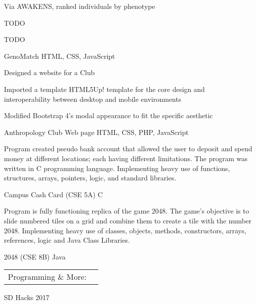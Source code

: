\documentclass[]{awesome-cv}
\begin{document}
\begin{cventries}
	\cventry
	{\begin{cvitems}
	    \item Via AWAKENS, ranked individuals by phenotype
        \item TODO
        \item TODO
    \end{cvitems}}
	{GenoMatch}
	{HTML, CSS, JavaScript}
	{}
	{}
	
	\vspace{-5mm}
	\cventry
	{\begin{cvitems}
        \item Designed a website for a Club
        \item Imported a template HTML5Up! template for the core design and interoperability between desktop and mobile environments
        \item Modified Bootstrap 4’s modal appearance to fit the specific aesthetic
    \end{cvitems}}
	{Anthropology Club Web page}
	{HTML, CSS, PHP, JavaScript}
	{}
	{}

	\vspace{-5mm}
	\cventry
	{\begin{cvitems}
        \item Program created pseudo bank account that allowed the user to deposit and spend money at different locations; each having different limitations. The program was written in C programming language. Implementing heavy use of functions, structures, arrays, pointers, logic, and standard libraries.
    \end{cvitems}}
	{Campus Cash Card (CSE 5A)}
	{C}
	{}
	{}

	\vspace{-5mm}
	\cventry
	{\begin{cvitems}
        \item Program is fully functioning replica of the game 2048. The game's objective is to slide numbered tiles on a grid and combine them to create a tile with the number 2048. Implementing heavy use of classes, objects, methods, constructors, arrays, references, logic and Java Class Libraries.
    \end{cvitems}}
	{2048 (CSE 8B)}
	{Java}
	{}
	{}

	\vspace{-5mm}
\end{cventries}
\begin{cventries}
	\cventry
	{}
	{\def\arraystretch{1.15}{\begin{tabular}{ l l }
		Programming \& More:  & {\skill{ Java, C, HTML, CSS, JavaScript, \LaTeX, MySQL, Git, Unix Shell, Ubuntu}} \\
		\end{tabular}}}
	{}
	{}
	{}
\end{cventries}

\vspace{-7mm}
\begin{cvhonors}
	\cvhonor
	{\begin{cvitems}
	    \item SD Hacks 2017
	\end{cvitems}}
	{}
	{}
	{}
\end{cvhonors}
\ 
\end{document}
